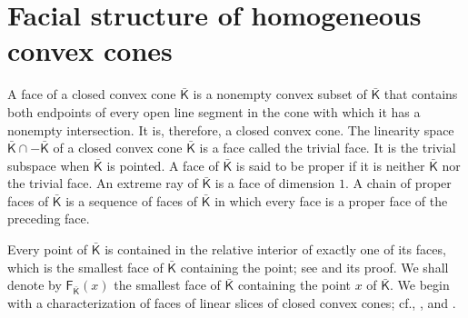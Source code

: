 \documentclass[oneside]{amsart}
\theoremstyle{plain}
\theoremstyle{definition}
\theoremstyle{remark}
\numberwithin{equation}{section}
\begin{document}
\section{Facial structure of homogeneous convex cones}
\label{section:facialstructure}

A face of a closed convex cone $\bar{\mathsf{K}}$ is a nonempty convex
subset of $\bar{\mathsf{K}}$ that contains both endpoints of every open
line segment in the cone with which it has a nonempty intersection. It is,
therefore, a closed convex cone. The linearity space $\bar{\mathsf{K}} \cap
-\bar{\mathsf{K}}$ of a closed convex cone $\bar{\mathsf{K}}$ is a face
called the trivial face. It is the trivial subspace when $\bar{\mathsf{K}}$
is pointed. A face of $\bar{\mathsf{K}}$ is said to be proper if it is
neither $\bar{\mathsf{K}}$ nor the trivial face. An extreme ray of
$\bar{\mathsf{K}}$ is a face of dimension $1$. A chain of proper faces of
$\bar{\mathsf{K}}$ is a sequence of faces of $\bar{\mathsf{K}}$ in which
every face is a proper face of the preceding face.

Every point of $\bar{\mathsf{K}}$ is contained in the relative interior of
exactly one of its faces, which is the smallest face of $\bar{\mathsf{K}}$
containing the point; see \cite[Theorem~18.2]{Rock97} and its proof. We
shall denote by $\mathsf{F}_{\bar{\mathsf{K}}}(x)$ the smallest face of
$\bar{\mathsf{K}}$ containing the point $x$ of $\bar{\mathsf{K}}$. We begin
with a characterization of faces of linear slices of closed convex cones;
cf.\@ \cite[Exercise~9,~Page~21]{Gru03}, \cite[Proposition~5.8]{Weis24},
and \cite[Proposition~2.13]{ShiWeis21}.
\end{document}
